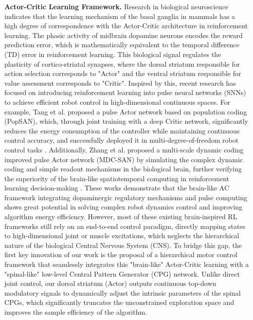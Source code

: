 \documentclass[lettersize,journal]{IEEEtran}
\begin{document}
\textbf{Actor-Critic Learning Framework.}
Research in biological neuroscience indicates that the learning mechanism of the basal ganglia in mammals has a high degree of correspondence with the Actor-Critic architecture in reinforcement learning.
The phasic activity of midbrain dopamine neurons encodes the reward prediction error, which is mathematically equivalent to the temporal difference (TD) error in reinforcement learning.
This biological signal regulates the plasticity of cortico-striatal synapses, where the dorsal striatum responsible for action selection corresponds to "Actor" and the ventral striatum responsible for value assessment corresponds to "Critic".
Inspired by this, recent research has focused on introducing reinforcement learning into pulse neural networks (SNNs) to achieve efficient robot control in high-dimensional continuous spaces.
For example, Tang et al. proposed a pulse Actor network based on population coding (PopSAN), which, through joint training with a deep Critic network, significantly reduces the energy consumption of the controller while maintaining continuous control accuracy, and successfully deployed it in multi-degree-of-freedom robot control tasks \cite{tang2021deep}.
Additionally, Zhang et al. proposed a multi-scale dynamic coding improved pulse Actor network (MDC-SAN) by simulating the complex dynamic coding and simple readout mechanisms in the biological brain, further verifying the superiority of the brain-like spatiotemporal computing in reinforcement learning decision-making \cite{zhang2022multi}.
These works demonstrate that the brain-like AC framework integrating dopaminergic regulatory mechanisms and pulse computing shows great potential in solving complex robot dynamics control and improving algorithm energy efficiency.
However, most of these existing brain-inspired RL frameworks still rely on an end-to-end control paradigm, directly mapping states to high-dimensional joint or muscle excitations, which neglects the hierarchical nature of the biological Central Nervous System (CNS). 
To bridge this gap, the first key innovation of our work is the proposal of a hierarchical motor control framework that seamlessly integrates this "brain-like" Actor-Critic learning with a "spinal-like" low-level Central Pattern Generator (CPG) network. 
Unlike direct joint control, our dorsal striatum (Actor) outputs continuous top-down modulatory signals to dynamically adjust the intrinsic parameters of the spinal CPGs, which significantly truncates the unconstrained exploration space and improves the sample efficiency of the algorithm.
\end{document}
